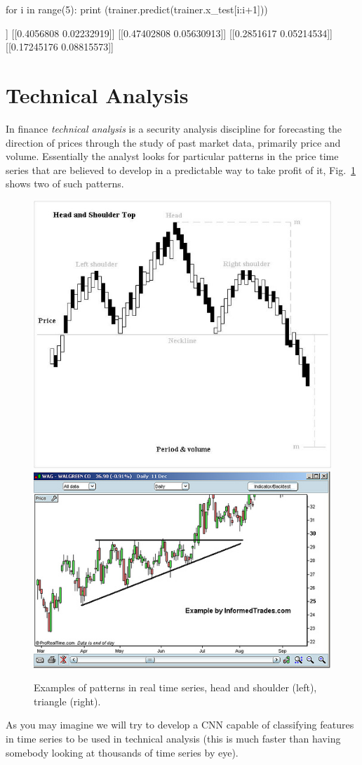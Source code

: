 \begin{ipython}
for i in range(5):
    print (trainer.predict(trainer.x_test[i:i+1]))
\end{ipython}
\begin{ioutput}
[[0.3825101  0.09229672]]
[[0.4056808  0.02232919]]
[[0.47402808 0.05630913]]
[[0.2851617  0.05214534]]
[[0.17245176 0.08815573]]
\end{ioutput}

\section{Technical Analysis}
\label{technical-analysis}

In finance \emph{technical analysis} is a security analysis discipline for forecasting the direction of prices through the study of past market data, primarily price and volume. Essentially the analyst looks for particular patterns in the price time series that are believed to develop in a predictable way to take profit of it, Fig.~\ref{fig:tech_ana} shows two of such patterns.

\begin{figure}[htb]
	\centering
	\includegraphics[width=0.4\linewidth]{figures/H_and_s_top_new.jpg}\qquad
	\includegraphics[width=0.4\linewidth]{figures/Triangle-ascending.jpg}
	\caption{Examples of patterns in real time series, head and shoulder (left), triangle (right).}
        \label{fig:tech_ana}
\end{figure}

As you may imagine we will try to develop a CNN capable of classifying  features in time series to be used in technical analysis (this is much faster than having somebody looking at thousands of time series by eye).

